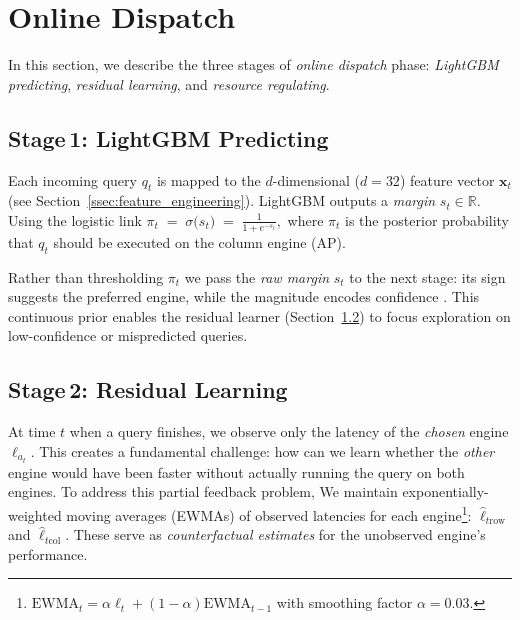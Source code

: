 \documentclass[sigconf, nonacm]{acmart}
\newcommand{\lrow}[1][]{\ell_{#1\mathrm{row}}}   %
\newcommand{\lcol}[1][]{\ell_{#1\mathrm{col}}}   %
\begin{document}
\section{Online Dispatch}\label{sec:online}

In this section, we describe the three stages of \emph{online dispatch} phase: \textit{LightGBM predicting}, \textit{residual learning}, and \textit{resource regulating}.

\subsection{Stage\,1: LightGBM Predicting}\label{ssec:online_lgbm}


Each incoming query \(q_t\) is mapped to the
$d$-dimensional ($d=32$) feature vector
\(\mathbf x_t\) (see Section~\ref{ssec:feature_engineering}). 
LightGBM outputs a \emph{margin}
\(s_t \in \mathbb{R}\).
Using the logistic link
\(
 \pi_t \;=\; \sigma\!\bigl(s_t\bigr)
         \;=\;
         \frac{1}{1+e^{-s_t}}, 
\)
where \(\pi_t\) is the posterior probability that
\(q_t\) should be executed on the column engine (\textsf{AP}).


Rather than thresholding
\(\pi_t\) we pass the \emph{raw margin} \(s_t\) to the next stage:
its sign suggests the preferred engine,
while the magnitude encodes confidence
\cite{guo2017calibration}.
This continuous prior enables the residual learner
(Section~\ref{ssec:online_residual}) to focus exploration on
low-confidence or mispredicted queries.


\subsection{Stage\,2: Residual Learning}\label{ssec:online_residual}

At time $t$ when a query finishes, we observe only the latency of the \emph{chosen} engine $\ell_{a_t}$. This creates a fundamental challenge: how can we learn whether the \emph{other} engine would have been faster without actually running the query on both engines.
To address this partial feedback problem, We maintain exponentially-weighted moving averages (EWMAs) of observed latencies for each engine\footnote{$\text{EWMA}_t=\alpha\ell_t+(1-\alpha)\text{EWMA}_{t-1}$ with smoothing factor $\alpha=0.03$.}: $\hat\lrow[t]$ and $\hat\lcol[t]$. These serve as \emph{counterfactual estimates} for the unobserved engine's performance.
\end{document}

